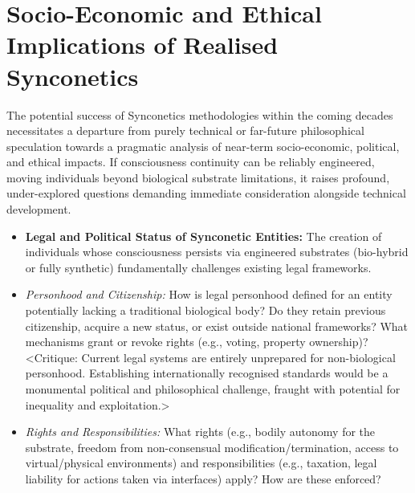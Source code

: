 \documentclass[10pt]{article}
\begin{document}
\begin{sloppypar}
\begin{itemize}
  \end{itemize}

  \section{Socio-Economic and Ethical Implications of Realised Synconetics}
  \label{sec:economics}

  The potential success of Synconetics methodologies within the coming decades necessitates a departure from purely technical or far-future philosophical speculation towards a pragmatic analysis of near-term socio-economic, political, and ethical impacts. If consciousness continuity can be reliably engineered, moving individuals beyond biological substrate limitations, it raises profound, under-explored questions demanding immediate consideration alongside technical development.

  \begin{itemize}
    \item \textbf{Legal and Political Status of Synconetic Entities:} The creation of individuals whose consciousness persists via engineered substrates (bio-hybrid or fully synthetic) fundamentally challenges existing legal frameworks.
    \item \textit{Personhood and Citizenship:} How is legal personhood defined for an entity potentially lacking a traditional biological body? Do they retain previous citizenship, acquire a new status, or exist outside national frameworks? What mechanisms grant or revoke rights (e.g., voting, property ownership)? <Critique: Current legal systems are entirely unprepared for non-biological personhood. Establishing internationally recognised standards would be a monumental political and philosophical challenge, fraught with potential for inequality and exploitation.>
    \item \textit{Rights and Responsibilities:} What rights (e.g., bodily autonomy for the substrate, freedom from non-consensual modification/termination, access to virtual/physical environments) and responsibilities (e.g., taxation, legal liability for actions taken via interfaces) apply? How are these enforced?


\end{itemize}
\end{sloppypar}
\end{document}
